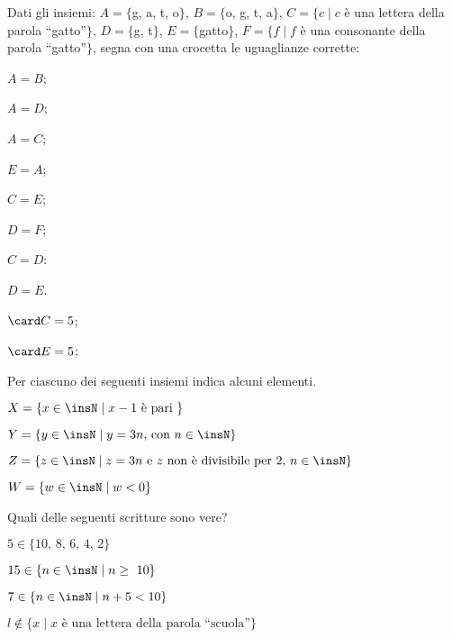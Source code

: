 \begin{esercizio}
Dati gli insiemi:
$A=\{$g, a, t, o$\}$, $B=\{$o, g, t, a$\}$, $C=\{c\mid c$ è una lettera della parola ``gatto''$\}$,
$D=\{$g, t$\}$, $E=\{$gatto$\}$, $F=\{f\mid f$ è una consonante della parola ``gatto''$\}$,
segna con una crocetta le uguaglianze corrette:
\begin{multicols}{4}
\begin{enumeratea}
 \item $A = B$;
 \item $A = D$;
 \item $A = C$;
 \item $E = A$;
 \item $C = E$;
 \item $D = F$;
 \item $C = D$:
 \item $D = E$.
 \columnbreak
 \item $\card C=5$;
 \item $\card E=5$;
\end{enumeratea}
\end{multicols}
\end{esercizio}

\begin{esercizio}
Per ciascuno dei seguenti insiemi indica alcuni elementi.
\TabPositions{6cm}
\begin{enumeratea}
\item $X=\{x\in\insN\mid x-1\text{ è pari }\}$\dotfill
\item $Y=\{y\in\insN\mid y=3n\text{, con } n\in\insN\}$\dotfill
\item $Z=\{z\in\insN\mid z=3n\text{ e } z\text{ non è divisibile per~2, }n\in\insN\}$\dotfill
\item $W=\{w\in\insN\mid w<0\}$\dotfill
\end{enumeratea}
\end{esercizio}

\begin{esercizio}
Quali delle seguenti scritture sono vere?
\begin{enumeratea}
\TabPositions{7cm}
\item $5\in \{\text{10, 8, 6, 4, 2}\}$\tab\boxV\quad\boxF
\item $15\in \{n\in\insN\mid n\ge~10\}$\tab\boxV\quad\boxF
\item $7\in \{n\in\insN\mid n+5<10\}$\tab\boxV\quad\boxF
\item $l\notin\{x\mid x\text{ è una lettera della parola ``scuola''}\}$\tab\boxV\quad\boxF
\end{enumeratea}
\end{esercizio}

